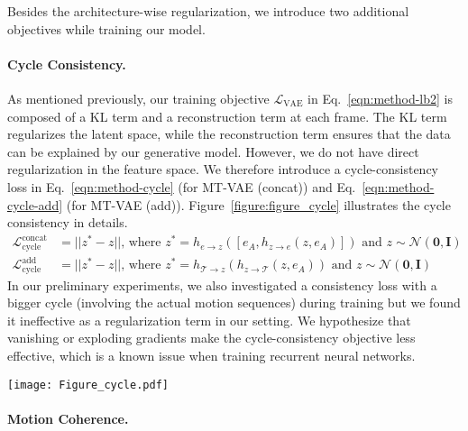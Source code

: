 \documentclass[runningheads]{llncs}
\begin{document}
Besides the architecture-wise regularization, we introduce two additional objectives while training our model.
\vspace*{-0.1in}
\paragraph{Cycle Consistency.} 
As mentioned previously, our training objective $\mathcal{L}_\text{VAE}$ in Eq.~\ref{eqn:method-lb2} is composed of a KL term and a reconstruction term at each frame.
The KL term regularizes the latent space, while the reconstruction term ensures that the data can be explained by our generative model.
However, we do not have direct regularization in the feature space.
We therefore introduce a cycle-consistency loss in Eq.~\ref{eqn:method-cycle} (for MT-VAE (concat)) and Eq.~\ref{eqn:method-cycle-add} (for MT-VAE (add)).
Figure~\ref{figure:figure_cycle} illustrates the cycle consistency in details.
\begin{align}
\mathcal{L}_\text{cycle}^\text{concat} &= ||z^* - z||\text{, where $z^* = h_{e \rightarrow z}([e_A, h_{z\rightarrow e}(z, e_A)])$ and $z \sim \mathcal{N}(\mathbf{0}, \mathbf{I})$}\label{eqn:method-cycle}\\
\mathcal{L}^\text{add}_\text{cycle} &= ||z^* - z||\text{, where $z^* = h_{\mathcal{T} \rightarrow z}(h_{z\rightarrow \mathcal{T}}(z, e_A))$ and $z \sim \mathcal{N}(\mathbf{0}, \mathbf{I})$}
\label{eqn:method-cycle-add}
\end{align}
In our preliminary experiments, we also investigated a consistency loss with a bigger cycle (involving the actual motion sequences) during training but we found it ineffective as a regularization term in our setting.
We hypothesize that vanishing or exploding gradients make the cycle-consistency objective less effective, which is a known issue when training recurrent neural networks.


\begin{figure*}[t]
\centering
\texttt{[image: Figure\_cycle.pdf]}
\caption{Illustrations of cycle consistency in MT-VAE variations. }
\label{figure:figure_cycle}
\vspace*{-0.2in}
\end{figure*}

\vspace*{-0.1in}
\paragraph{Motion Coherence.}
\end{document}
